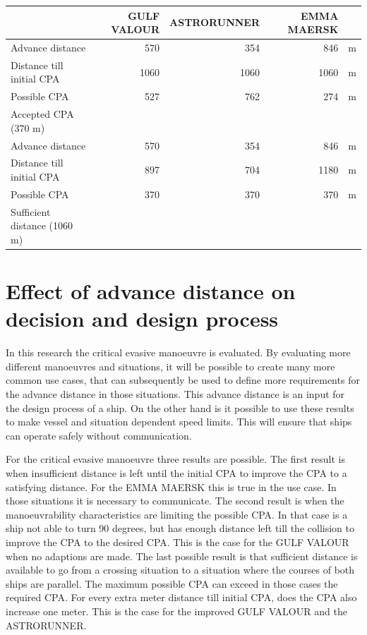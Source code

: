 \begin{table}[p]
	\centering
	\begin{tabular}{l | r r r l}
		\toprule
		& GULF VALOUR & ASTRORUNNER & EMMA MAERSK & \\
		\midrule
		Advance distance & 570 & 354 & 846 & m \\
		Distance till initial CPA & 1060 & 1060 & 1060 & m \\
		Possible CPA & 527 & 762 & 274 & m \\
		Accepted CPA (370 m) & \cmark & \cmark & \xmark & \\
		\midrule
		Advance distance & 570 & 354 & 846 & m \\
		Distance till initial CPA & 897 & 704 & 1180 & m \\
		Possible CPA & 370 & 370 & 370 & m \\
		Sufficient distance (1060 m) & \cmark & \cmark & \xmark & \\
		\bottomrule
	\end{tabular}
	\label{tab:result-use-case-improved}
\end{table}

\section{Effect of advance distance on decision and design process}
In this research the critical evasive manoeuvre is evaluated. By evaluating more different manoeuvres and situations, it will be possible to create many more common use cases, that can subsequently be used to define more requirements for the advance distance in those situations. This advance distance is an input for the design process of a ship. On the other hand is it possible to use these results to make vessel and situation dependent speed limits. This will ensure that ships can operate safely without communication.

For the critical evasive manoeuvre three results are possible. The first result is when insufficient distance is left until the initial CPA to improve the CPA to a satisfying distance. For the EMMA MAERSK this is true in the use case. In those situations it is necessary to communicate.
The second result is when the manoeuvrability characteristics are limiting the possible CPA. In that case is a ship not able to turn 90 degrees, but has enough distance left till the collision to improve the CPA to the desired CPA. This is the case for the GULF VALOUR when no adaptions are made.
The last possible result is that sufficient distance is available to go from a crossing situation to a situation where the courses of both ships are parallel. The maximum possible CPA can exceed in those cases the required CPA. For every extra meter distance till initial CPA, does the CPA also increase one meter. This is the case for the improved GULF VALOUR and the ASTRORUNNER.

